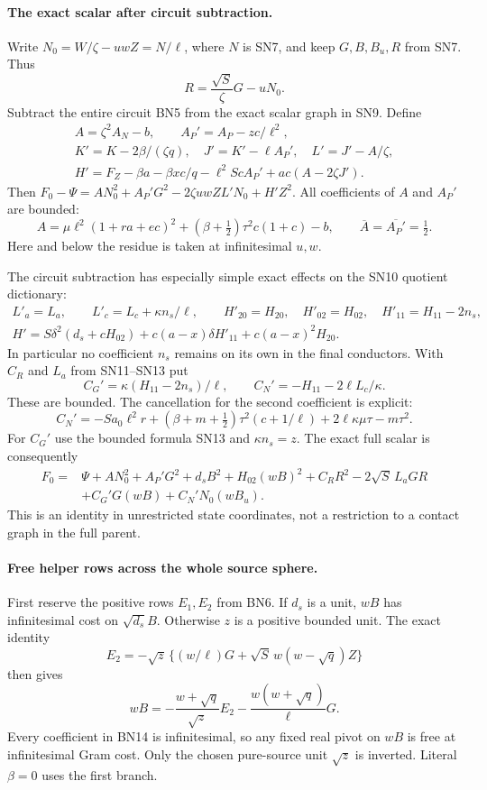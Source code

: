 \paragraph{The exact scalar after circuit subtraction.}
Write $N_0=W/\zeta-uwZ=N/\ell$, where $N$ is SN7, and keep
$G,B,B_u,R$ from SN7. Thus
\[
 R=\frac{\sqrt S}{\zeta}G-uN_0.
 \tag{BN7}
\]
Subtract the entire circuit BN5 from the exact scalar graph in SN9.
Define
\[
\begin{gathered}
 A=\zeta^2 A_N-b,\qquad A_P'=A_P-zc/\ell^2,\\
 K'=K-2\beta/(\zeta q),\quad J'=K'-\ell A_P',
 \quad L'=J'-A/\zeta,\\
 H'=F_Z-\beta a-\beta xc/q-\ell^2ScA_P'
                          +ac(A-2\zeta J').
\end{gathered}\tag{BN8}
\]
Then $F_0-\Psi=A N_0^2+A_P'G^2-2\zeta uwZL'N_0+H'Z^2$.
All coefficients of $A$ and $A_P'$ are bounded:
\[
 A=\mu\ell^2(1+ra+ec)^2
       +(\beta+\tfrac12)\tau^2c(1+c)-b,
 \qquad \overline A=\overline{A_P'}=\tfrac12.
 \tag{BN9}
\]
Here and below the residue is taken at infinitesimal $u,w$.

The circuit subtraction has especially simple exact effects on the
SN10 quotient dictionary:
\[
\begin{gathered}
 L'_a=L_a,\qquad L'_c=L_c+\kappa n_s/\ell,\qquad
 H'_{20}=H_{20},\quad H'_{02}=H_{02},\quad
 H'_{11}=H_{11}-2n_s,\\
 H'=S\delta^2(d_s+cH_{02})
               +c(a-x)\delta H'_{11}+c(a-x)^2H_{20}.
\end{gathered}\tag{BN10}
\]
In particular no coefficient $n_s$ remains on its own in the final
conductors. With $C_R$ and $L_a$ from SN11--SN13 put
\[
 C_G'=\kappa(H_{11}-2n_s)/\ell,\qquad
 C_N'=-H_{11}-2\ell L_c/\kappa.
 \tag{BN11}
\]
These are bounded. The cancellation for the second coefficient is
explicit:
\[
 C_N'=-Sa_0\ell^2r+(\beta+m+\tfrac12)\tau^2(c+1/\ell)
                 +2\ell\kappa\mu\tau-m\tau^2.
 \tag{BN12}
\]
For $C_G'$ use the bounded formula SN13 and $\kappa n_s=z$.
The exact full scalar is consequently
\[
\begin{split}
 F_0={}&\Psi+A N_0^2+A_P'G^2+d_sB^2+H_{02}(wB)^2
       +C_RR^2-2\sqrt S\,L_aGR\\
 &+C_G'G(wB)+C_N'N_0(wB_u).
\end{split}\tag{BN13}
\]
This is an identity in unrestricted state coordinates, not a
restriction to a contact graph in the full parent.

\paragraph{Free helper rows across the whole source sphere.}
First reserve the positive rows $E_1,E_2$ from BN6. If $d_s$ is a
unit, $wB$ has infinitesimal cost on $\sqrt{d_s}B$. Otherwise
$z$ is a positive bounded unit. The exact identity
\[
 E_2=-\sqrt z\,\{(w/\ell)G+
                          \sqrt S\,w(w-\sqrt q)Z\}
\]
then gives
\[
 wB=-\frac{w+\sqrt q}{\sqrt z}E_2
                   -\frac{w(w+\sqrt q)}\ell G.
 \tag{BN14}
\]
Every coefficient in BN14 is infinitesimal, so any fixed real pivot
on $wB$ is free at infinitesimal Gram cost. Only the chosen pure-source
unit $\sqrt z$ is inverted. Literal $\beta=0$ uses the first branch.

